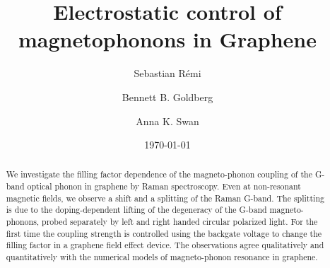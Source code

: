 \documentclass[prl,aps,superscriptaddress,showpacs,reprint]{revtex4-1}
\begin{document}
\title{Electrostatic control of magnetophonons in Graphene} %

\author{Sebastian R\'{e}mi}

\author{Bennett B. Goldberg}


\author{Anna K. Swan}

\date{\today}

\begin{abstract}
We investigate the filling factor dependence of the magneto-phonon coupling of the G-band optical phonon in graphene by Raman spectroscopy. Even at non-resonant magnetic fields, we observe a shift and a splitting of the Raman G-band. The splitting is due to the doping-dependent lifting of the degeneracy of the G-band magneto-phonons, probed separately by left and right handed circular polarized light. For the first time the coupling strength is controlled using the backgate voltage to change the filling factor in a graphene field effect device. The observations agree qualitatively and quantitatively with the numerical models of magneto-phonon resonance in graphene.
\end{abstract}


\maketitle %
\end{document}

